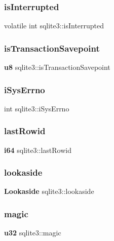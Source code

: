 \mbox{\label{structsqlite3_a80b995fd97507bbf978d6960adde53f8}} 
\subsubsection{isInterrupted}
{\footnotesize\ttfamily volatile int sqlite3\+::is\+Interrupted}

\mbox{\label{structsqlite3_acaca2a1d41db7b83a0fe8a477bd22d1d}} 
\subsubsection{isTransactionSavepoint}
{\footnotesize\ttfamily \textbf{ u8} sqlite3\+::is\+Transaction\+Savepoint}

\mbox{\label{structsqlite3_ace6e1a4f7d28246883bde14b3b12c26b}} 
\subsubsection{iSysErrno}
{\footnotesize\ttfamily int sqlite3\+::i\+Sys\+Errno}

\mbox{\label{structsqlite3_a9fff52fc4eb087fbb3e3271994fa5198}} 
\subsubsection{lastRowid}
{\footnotesize\ttfamily \textbf{ i64} sqlite3\+::last\+Rowid}

\mbox{\label{structsqlite3_a8a42788add62e1a59d0c930ecc190e87}} 
\subsubsection{lookaside}
{\footnotesize\ttfamily \textbf{ Lookaside} sqlite3\+::lookaside}

\mbox{\label{structsqlite3_ad55cf0f70220c91382bc00b6a9423a0d}} 
\subsubsection{magic}
{\footnotesize\ttfamily \textbf{ u32} sqlite3\+::magic}

